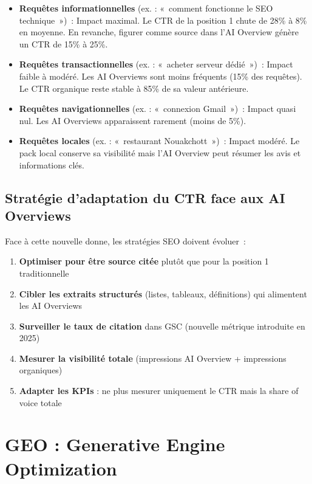 \documentclass[12pt,a4paper,twoside]{report}
\begin{document}
\begin{itemize}
    \item \textbf{Requêtes informationnelles} (ex. : «~comment fonctionne le SEO technique~»)~: Impact maximal. Le CTR de la position 1 chute de 28\% à 8\% en moyenne. En revanche, figurer comme source dans l'AI Overview génère un CTR de 15\% à 25\%.
    \item \textbf{Requêtes transactionnelles} (ex. : «~acheter serveur dédié~»)~: Impact faible à modéré. Les AI Overviews sont moins fréquents (15\% des requêtes). Le CTR organique reste stable à 85\% de sa valeur antérieure.
    \item \textbf{Requêtes navigationnelles} (ex. : «~connexion Gmail~»)~: Impact quasi nul. Les AI Overviews apparaissent rarement (moins de 5\%).
    \item \textbf{Requêtes locales} (ex. : «~restaurant Nouakchott~»)~: Impact modéré. Le pack local conserve sa visibilité mais l'AI Overview peut résumer les avis et informations clés.
\end{itemize}

\subsection{Stratégie d'adaptation du CTR face aux AI Overviews}

Face à cette nouvelle donne, les stratégies SEO doivent évoluer~:

\begin{enumerate}
    \item \textbf{Optimiser pour être source citée} plutôt que pour la position 1 traditionnelle
    \item \textbf{Cibler les extraits structurés} (listes, tableaux, définitions) qui alimentent les AI Overviews
    \item \textbf{Surveiller le taux de citation} dans GSC (nouvelle métrique introduite en 2025)
    \item \textbf{Mesurer la visibilité totale} (impressions AI Overview + impressions organiques)
    \item \textbf{Adapter les KPIs} : ne plus mesurer uniquement le CTR mais la share of voice totale
\end{enumerate}

\section{GEO : Generative Engine Optimization}
\end{document}
